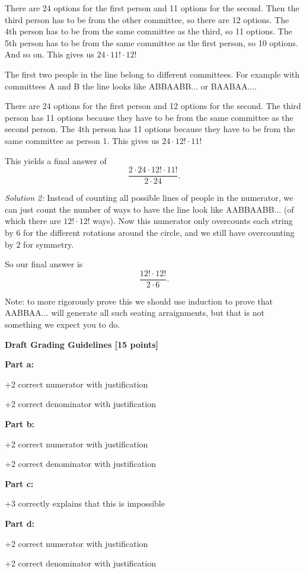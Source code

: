 \documentclass[12pt]{exam}
\begin{document}
\begin{solution}
\begin{qparts}
\begin{stmts}
        There are 24 options for the first person and 11 options for the second. Then the third person has to be from the other committee, so there are 12 options. The 4th person has to be from the same committee as the third, so 11 options. The 5th person has to be from the same committee as the first person, so 10 options. And so on. This gives us $24\cdot 11! \cdot 12!$

        \item The first two people in the line belong to different committees. For example with committees A and B the line looks like ABBAABB... or BAABAA....
        
        There are 24 options for the first person and 12 options for the second. The third person has 11 options because they have to be from the same committee as the second person. The 4th person has 11 options because they have to be from the same committee as person 1. This gives us $24\cdot 12! \cdot 11!$
    \end{stmts}
    This yields a final answer of
    $$\frac{2\cdot 24\cdot 12! \cdot 11!}{2\cdot 24}.$$
    
    \emph{Solution 2:} Instead of counting all possible lines of people in the numerator, we can just count the number of ways to have the line look like AABBAABB... (of which there are $12!\cdot 12!$ ways). Now this numerator only overcounts each string by 6 for the different rotations around the circle, and we still have overcounting by 2 for symmetry. 
    
    So our final answer is
    $$\frac{12!\cdot 12!}{2\cdot 6}.$$
    
    Note: to more rigorously prove this we should use induction to prove that AABBAA... will generate all such seating arraignments, but that is not something we expect you to do.
\end{qparts}

\textbf{Draft Grading Guidelines [15 points]} 

\textbf{Part a:}
\begin{gwguidelines}
    \item +2 correct numerator with justification
    \item +2 correct denominator with justification
\end{gwguidelines}
\textbf{Part b:}
\begin{gwguidelines}[resume]
    \item +2 correct numerator with justification
    \item +2 correct denominator with justification
\end{gwguidelines}
\textbf{Part c:}
\begin{gwguidelines}[resume]
    \item +3 correctly explains that this is impossible
\end{gwguidelines}
\textbf{Part d:}
\begin{gwguidelines}[resume]
    \item +2 correct numerator with justification
    \item +2 correct denominator with justification
\end{gwguidelines}
\end{solution}
\end{document}

